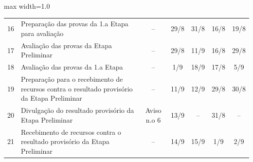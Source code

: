 \begin{quadro}[htb]
\begin{adjustbox}{max width=1.0\linewidth}
\begin{tabular}{|c|l|c|c|c|c|c|}
16 & Preparação das provas   da 1.a Etapa para avaliação                                                                                        & –                   & 29/8                                                                            & 31/8                                  & 16/8                                                                            & 19/8                 \\
\rowcolor[HTML]{FCD5B4} 
17 & Avaliação das provas   da Etapa Preliminar                                                                                                 & –                   & 29/8                                                                            & 11/9                                  & 16/8                                                                            & 29/8                 \\
\rowcolor[HTML]{FCD5B4} 
18 & Avaliação das provas   da 1.a Etapa                                                                                                        & –                   & 1/9                                                                             & 18/9                                  & 17/8                                                                            & 5/9                  \\
19 & Preparação para o   recebimento de recursos contra o resultado provisório da Etapa Preliminar                                              & –                   & 11/9                                                                            & 12/9                                  & 29/8                                                                            & 30/8                 \\
\rowcolor[HTML]{92CDDC} 
20 & Divulgação do   resultado provisório da Etapa Preliminar                                                                                   & Aviso n.o 6         & 13/9                                                                            & –                                     & 31/8                                                                            & –                    \\
21 & Recebimento de   recursos contra o resultado provisório da Etapa Preliminar                                                                & –                   & 14/9                                                                            & 15/9                                  & 1/9                                                                             & 2/9                  \\

\end{tabular}
\end{adjustbox}
\end{quadro}
